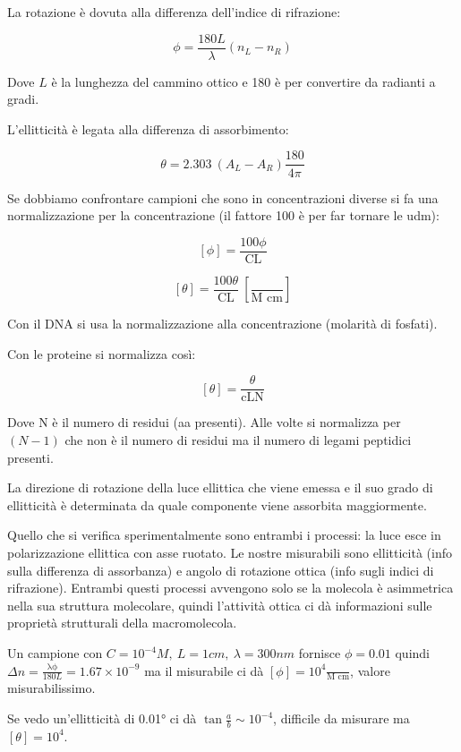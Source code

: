 La rotazione è dovuta alla differenza dell'indice di rifrazione:

\[\phi = \frac{180L}{\lambda}(n_{L} - n_{R})\]

Dove \(L\) è la lunghezza del cammino ottico e 180 è per convertire da
radianti a gradi.

L'ellitticità è legata alla differenza di assorbimento:

\[\theta = 2.303\ \left( A_{L} - A_{R} \right)\frac{180}{4\pi}\]

Se dobbiamo confrontare campioni che sono in concentrazioni diverse si
fa una normalizzazione per la concentrazione (il fattore 100 è per far
tornare le udm):

\[\left\lbrack \phi \right\rbrack = \frac{100\phi}{\text{CL}}\]

\[\left\lbrack \theta \right\rbrack = \frac{100\theta}{\text{CL}}\ \left\lbrack \frac{}{\text{M\ cm}} \right\rbrack\]

Con il DNA si usa la normalizzazione alla concentrazione (molarità di
fosfati).

Con le proteine si normalizza così:

\[\left\lbrack \theta \right\rbrack = \frac{\theta}{\text{cLN}}\]

Dove N è il numero di residui (aa presenti). Alle volte si normalizza
per \((N - 1)\) che non è il numero di residui ma il numero di legami
peptidici presenti.

La direzione di rotazione della luce ellittica che viene emessa e il suo
grado di ellitticità è determinata da quale componente viene assorbita
maggiormente.

Quello che si verifica sperimentalmente sono entrambi i processi: la
luce esce in polarizzazione ellittica con asse ruotato. Le nostre
misurabili sono ellitticità (info sulla differenza di assorbanza) e
angolo di rotazione ottica (info sugli indici di rifrazione). Entrambi
questi processi avvengono solo se la molecola è asimmetrica nella sua
struttura molecolare, quindi l'attività ottica ci dà informazioni sulle
proprietà strutturali della macromolecola.

Un campione con \(C = 10^{- 4}M,\ L = 1cm,\ \lambda = 300nm\) fornisce
\(\phi = 0.01\) quindi
\(\Delta n = \frac{\text{λϕ}}{180L} = 1.67 \times 10^{- 9}\) ma il
misurabile ci dà
\(\left\lbrack \phi \right\rbrack = 10^{4}\frac{}{\text{M\ cm}}\),
valore misurabilissimo.

Se vedo un'ellitticità di 0.01° ci dà \(\tan\frac{a}{b} \sim 10^{- 4}\),
difficile da misurare ma \(\left\lbrack \theta \right\rbrack = 10^{4}\).


